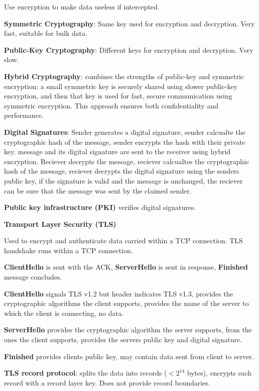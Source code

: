 \documentclass{article}
\begin{document}
Use encryption to make data useless if intercepted.

\textbf{Symmetric Cryptography}: Same key used for encryption and decryption. Very fast, suitable for bulk data.

\textbf{Public-Key Cryptography}: Different keys for encryption and decryption. Very slow.

\textbf{Hybrid Cryptography}: combines the strengths of public-key and symmetric encryption:
a small symmetric key is securely shared using slower public-key encryption,
and then that key is used for fast, secure communication using symmetric encryption.
This approach ensures both confidentiality and performance.

\textbf{Digital Signatures}: Sender generates a digital signature,
sender calcualte the cryptographic hash of the message,
sender encrypts the hash with their private key.
message and its digital signature are sent to the receiver using hybrid encryption.
Reciever decrypts the message,
reciever calcualtes the cryptographic hash of the message,
reciever decrypts the digital signature using the senders public key,
if the signature is valid and the message is unchanged, the reciever can be sure that the message was sent by the claimed sender.

\textbf{Public key infrastructure (PKI)} verifies digital signatures.

\vspace{\baselineskip}
\textbf{Transport Layer Security (TLS)}

Used to encrypt and authenticate data carried within a TCP connection.
TLS handshake runs within a TCP connection.

\textbf{ClientHello} is sent with the ACK, \textbf{ServerHello} is sent in response, \textbf{Finished} message concludes.

\textbf{ClientHello} signals TLS v1.2 but header indicates TLS v1.3, provides the cryptographic algorithms the client supports, provides the name of the server to which the client is connecting, no data.

\textbf{ServerHello} provides the cryptographic algorithm the server supports, from the ones the client supports, provides the servers public key and digital signature.

\textbf{Finished} provides clients public key, may contain data sent from client to server.

\textbf{TLS record protocol}: splits the data into records ($< 2^{14}$ bytes), encrypts each record with a record layer key. Does not provide record boundaries.
\end{document}

